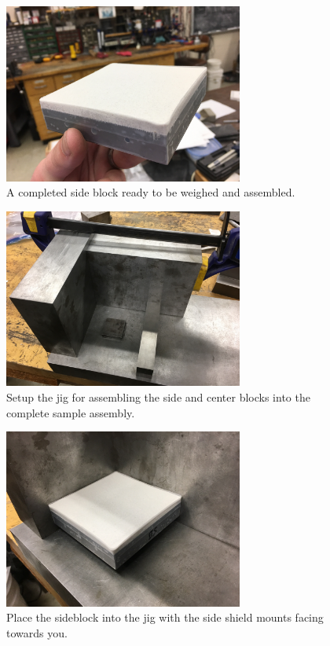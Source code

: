 \begin{figure}
	\centering
        \includegraphics[width=0.7\textwidth]{appendix_sample_prep/dds_finished_sideblock.jpg}
   	\caption{A completed side block ready to be weighed and assembled.}
  	\label{Fig:dds_finished_sideblock}
\end{figure}

\begin{figure}
	\centering
        \includegraphics[width=0.7\textwidth]{appendix_sample_prep/dds_ell_jig.jpg}
   	\caption{Setup the jig for assembling the side and center blocks into the complete sample assembly.}
  	\label{Fig:dds_ell_jig}
\end{figure}

\begin{figure}
	\centering
        \includegraphics[width=0.7\textwidth]{appendix_sample_prep/dds_sideblock_jig.jpg}
   	\caption{Place the sideblock into the jig with the side shield mounts facing towards you.}
  	\label{Fig:dds_sideblock_jig}
\end{figure}

